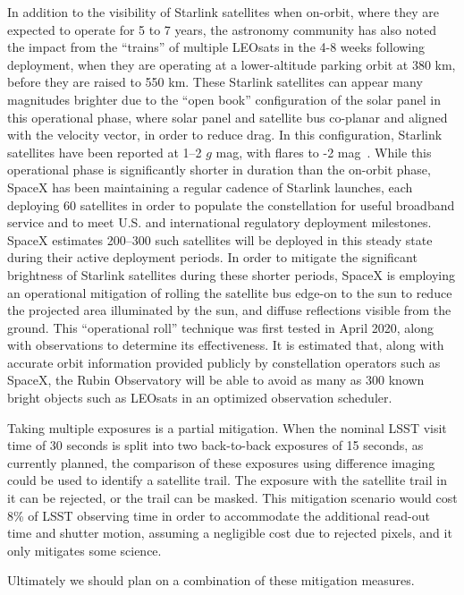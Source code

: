 \documentclass[twocolumn,trackchanges]{aastex63}
\begin{document}
In addition to the visibility of Starlink satellites when on-orbit, where they are expected to operate for 5 to 7 years, the astronomy community has also noted the impact from the ``trains'' of multiple LEOsats in the 4-8 weeks following deployment, when they are operating at a lower-altitude parking orbit at 380 km, before they are raised to 550 km.
These Starlink satellites can appear many magnitudes brighter due to the ``open book'' configuration of the solar panel in this operational phase, where solar panel and satellite bus  co-planar and aligned with the velocity vector, in order to reduce drag. In this configuration, Starlink satellites have been reported at 1--2 $g$ mag, with flares to -2 mag~\citep{2020AAS...23541003S}. While this operational phase is significantly shorter in duration than the on-orbit phase, SpaceX has been maintaining a regular cadence of Starlink launches, each deploying 60 satellites
in order to populate the constellation for useful broadband service and to meet U.S. and international regulatory deployment milestones.
SpaceX estimates 200--300 such satellites will be deployed in this steady state during their active deployment periods. In order to mitigate the significant brightness of Starlink satellites during these shorter periods, SpaceX is employing an operational mitigation of rolling the satellite bus edge-on to the sun to reduce the projected area illuminated by the sun, and diffuse reflections visible from the ground. This ``operational roll'' technique was first tested in April 2020, along with observations to determine its effectiveness. It is estimated that, along with accurate orbit information provided publicly by constellation operators such as SpaceX, the Rubin Observatory will be able to avoid as many as 300 known bright objects such as LEOsats in an optimized observation scheduler.

Taking multiple exposures is a partial mitigation. When the nominal LSST visit time of 30 seconds is split into two back-to-back exposures of 15 seconds, as currently planned, the comparison of these exposures using difference imaging could be used to identify a satellite trail. The exposure with the satellite trail in it can be rejected, or the trail can be masked. This mitigation scenario would cost 8\% of LSST observing time in order to accommodate the additional read-out time and shutter motion, assuming a negligible cost due to rejected pixels, and it only mitigates some science.

Ultimately we should plan on a combination of  these mitigation measures.
\end{document}
